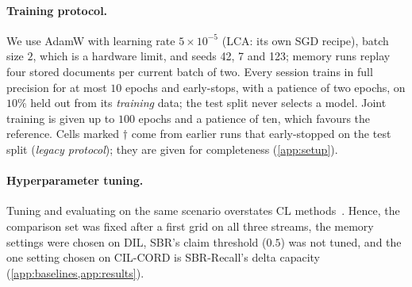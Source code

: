 \documentclass[10pt,twocolumn,letterpaper]{article}
\begin{document}
\paragraph{Training protocol.}\label{sec:protocol} We use AdamW with learning rate $5{\times}10^{-5}$ (LCA: its own SGD recipe), batch size $2$, which is a hardware limit, and seeds 42, 7 and 123; memory runs replay four stored documents per current batch of two. Every session trains in full precision for at most $10$ epochs and early-stops, with a patience of two epochs, on $10\%$ held out from its \emph{training} data; the test split never selects a model. Joint training is given up to $100$ epochs and a patience of ten, which favours the reference. Cells marked $\dagger$ come from earlier runs that early-stopped on the test split (\emph{legacy protocol}); they are given for completeness (\cref{app:setup}).

\paragraph{Hyperparameter tuning.} Tuning and evaluating on the same scenario overstates CL methods~\citep{cha2025hyperparameters}. Hence, the comparison set was fixed after a first grid on all three streams, the memory settings were chosen on DIL, SBR's claim threshold ($0.5$) was not tuned, and the one setting chosen on CIL-CORD is SBR-Recall's delta capacity (\cref{app:baselines,app:results}).

\begin{table}[t]
\centering\small
\setlength{\tabcolsep}{4pt}
\caption{\textbf{Comparison with continual-learning baselines} on LayoutLMv3 over six streams. F1: full-label F1; AA and AF: average accuracy and forgetting (\cref{sec:setup}). AA and F1: mean $\pm$ s.d. over three seeds, per-seed values when fewer; AF: mean; ``--'': not run. Bold: best of each column, Joint training aside; underlined: our best when a baseline is best. $^\dagger$legacy protocol; $^{n=k}$: $k$ clean seeds so far; $^{c}$one fp16 LwF seed that collapsed to all-background is excluded; $^{b}$with the $50$-document memory; on CIL-WildReceipt and DIL-XFUND, ER keeps $200$ documents and DER++ $250$; on CIL-FUNSD both keep $20$, the memory of the CoLaR cells there; $^{p}$made before we fixed our port's orthogonality penalty. Ports and protocols: \cref{app:baselines}; what each method stores: \cref{tab:memcmp}.}
\label{tab:main}
\resizebox{\linewidth}{!}{}
\end{table}
\end{document}
